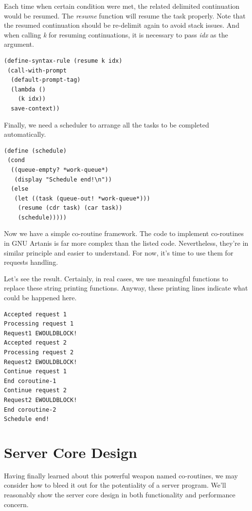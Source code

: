 \documentclass[numbers,numberedpars]{sigplanconf}
\begin{document}
Each time when certain condition were met, the related delimited continuation would be resumed. The {\it resume} function will resume the task
properly. Note that the resumed continuation should be re-delimit again to avoid stack issues. And when calling {\it k} for resuming continuations,
it is necessary to pass {\it idx} as the argument.

\begin{lstlisting}
(define-syntax-rule (resume k idx)
 (call-with-prompt
  (default-prompt-tag)
  (lambda ()
    (k idx))
  save-context))
\end{lstlisting}

Finally, we need a scheduler to arrange all the tasks to be completed automatically.

\begin{lstlisting}
(define (schedule)
 (cond
  ((queue-empty? *work-queue*)
   (display "Schedule end!\n"))
  (else
   (let ((task (queue-out! *work-queue*)))
    (resume (cdr task) (car task))
    (schedule)))))
\end{lstlisting}

Now we have a simple co-routine framework. The code to implement co-routines in GNU Artanis is far more complex than the listed code.
Nevertheless, they're in similar principle and easier to understand. For now, it's time to use them for requests handling.



Let's see the result. Certainly, in real cases, we use meaningful functions to replace these string printing functions. Anyway, these printing
lines indicate what could be happened here.

\begin{lstlisting}[caption=Coroutines running result]
Accepted request 1
Processing request 1
Request1 EWOULDBLOCK!
Accepted request 2
Processing request 2
Request2 EWOULDBLOCK!
Continue request 1
End coroutine-1
Continue request 2
Request2 EWOULDBLOCK!
End coroutine-2
Schedule end!
\end{lstlisting}

\section{Server Core Design}

Having finally learned about this powerful weapon named co-routines, we may consider how to bleed it out for the potentiality of a server program.
We'll reasonably show the server core design in both functionality and performance concern.
\end{document}
